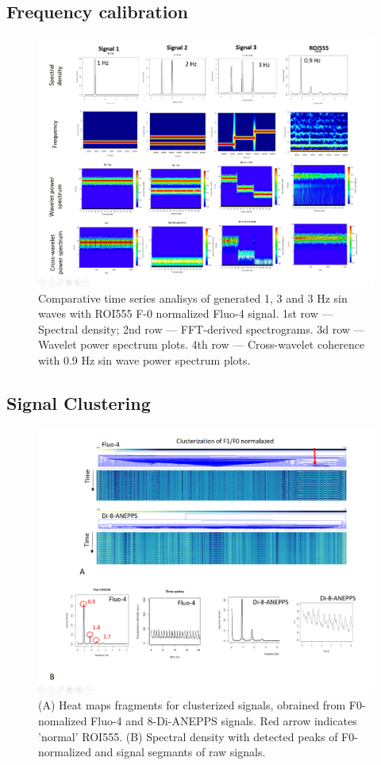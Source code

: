 \documentclass{biophys-new}
\begin{document}
\subsection*{Frequency calibration}

\begin{figure}
    \includegraphics[width=0.9\linewidth]{fig7.png}
    \caption{Comparative time series analisys of generated 1, 3 and 3 Hz sin waves with ROI555 F-0 normalized Fluo-4 signal. 1st row --- Spectral density; 2nd row --- FFT-derived spectrograms. 3d row --- Wavelet power spectrum plots. 4th row --- Cross-wavelet coherence with 0.9 Hz sin wave power spectrum plots. }
    \label{fig:fig7}
\end{figure}


\subsection*{Signal Clustering}

\begin{figure}
    \includegraphics[width=0.9\linewidth]{fig6.png}
    \caption{(A) Heat maps fragments for clusterized signals, obrained from  F0-nomalized Fluo-4 and 8-Di-ANEPPS signals. Red arrow indicates 'normal' ROI555. (B) Spectral density with detected peaks of F0-normalized and signal segmants of raw signals.}
    \label{fig:fig6}
\end{figure}
\end{document}
